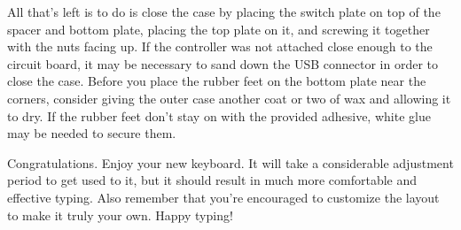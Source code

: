 \documentclass{article}
\begin{document}
\vspace{1em}

All that's left is to do is close the case by placing the switch plate
on top of the spacer and bottom plate, placing the top plate on it,
and screwing it together with the nuts facing up. If the controller
was not attached close enough to the circuit board, it may be
necessary to sand down the USB connector in order to close the
case. Before you place the rubber feet on the bottom plate near the
corners, consider giving the outer case another coat or two of wax and
allowing it to dry. If the rubber feet don't stay on with the provided
adhesive, white glue may be needed to secure them.

\vspace{1em}

Congratulations. Enjoy your new keyboard. It will take a
considerable adjustment period to get used to it, but it should result
in much more comfortable and effective typing. Also remember that
you're encouraged to customize the layout to make it truly your
own. Happy typing!

\end{document}
